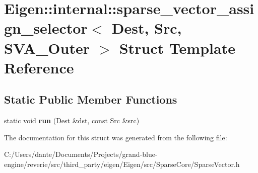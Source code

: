 \hypertarget{struct_eigen_1_1internal_1_1sparse__vector__assign__selector_3_01_dest_00_01_src_00_01_s_v_a___outer_01_4}{}\section{Eigen\+::internal\+::sparse\+\_\+vector\+\_\+assign\+\_\+selector$<$ Dest, Src, S\+V\+A\+\_\+\+Outer $>$ Struct Template Reference}
\label{struct_eigen_1_1internal_1_1sparse__vector__assign__selector_3_01_dest_00_01_src_00_01_s_v_a___outer_01_4}
\subsection*{Static Public Member Functions}
\begin{DoxyCompactItemize}
\item 
\mbox{\label{struct_eigen_1_1internal_1_1sparse__vector__assign__selector_3_01_dest_00_01_src_00_01_s_v_a___outer_01_4_ab645fb8871541297330c452a57c1c9fc}} 
static void {\bfseries run} (Dest \&dst, const Src \&src)
\end{DoxyCompactItemize}


The documentation for this struct was generated from the following file\+:\begin{DoxyCompactItemize}
\item 
C\+:/\+Users/dante/\+Documents/\+Projects/grand-\/blue-\/engine/reverie/src/third\+\_\+party/eigen/\+Eigen/src/\+Sparse\+Core/Sparse\+Vector.\+h\end{DoxyCompactItemize}
